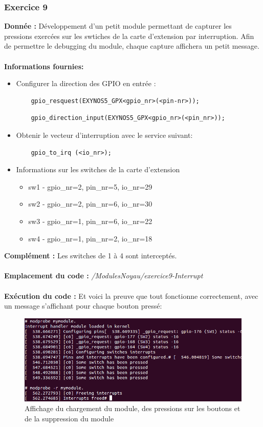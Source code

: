 \subsubsection{Exercice 9}
\textbf{Donnée : }Développement d'un petit module permettant de capturer les pressions exercées sur les swtiches de la carte d'extension par interruption. Afin de permettre le debugging du module, chaque capture affichera un petit message.\\\\
\textbf{Informations fournies:}
\begin{itemize}
	\item Configurer la direction des GPIO en entrée : 
	\begin{lstlisting}
	gpio_resquest(EXYNOS5_GPX<gpio_nr>(<pin-nr>));
	\end{lstlisting}
	\begin{lstlisting}
	gpio_direction_input(EXYNOS5_GPX<gpio_nr>(<pin_nr>));
	\end{lstlisting}
	\item Obtenir le vecteur d'interruption avec le service suivant:
	\begin{lstlisting}
	gpio_to_irq (<io_nr>);
	\end{lstlisting}
	\item Informations sur les switches de la carte d'extension 
	\begin{itemize}
	\item sw1 - gpio\_nr=2, pin\_nr=5,  io\_nr=29
	\item sw2 - gpio\_nr=2, pin\_nr=6,  io\_nr=30
	\item sw3 - gpio\_nr=1, pin\_nr=6,  io\_nr=22
	\item sw4 - gpio\_nr=1, pin\_nr=2,  io\_nr=18\\
	\end{itemize}
\end{itemize}
\textbf{Complément : } Les switches de 1 à 4 sont interceptés. \\\\
\textbf{Emplacement du code : } \textit{/ModulesNoyau/exercice9-Interrupt}\\\\
\textbf{Exécution du code : }
Et voici la preuve que tout fonctionne correctement, avec un message s'affichant pour chaque bouton pressé:
\begin{figure}[H]
	\begin{center}
		\includegraphics[width=16.5cm]{img/interrupt_success.png}
		\caption{Affichage du chargement du module, des pressions sur les boutons et de la suppression du module}
		\label{ser1ex9}
	\end{center}
\end{figure}
